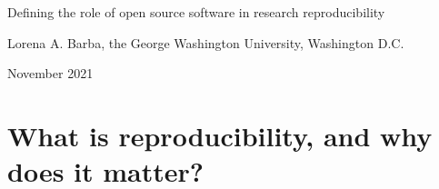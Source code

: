 \documentclass{statement}
\newlength{\up}
\begin{document}

\renewcommand{\thepage} {\arabic{page}}

\thispagestyle{empty}

{ \Huge Defining the role of open source software in research reproducibility} 
\medskip

Lorena A. Barba, the George Washington University, Washington D.C. 

November 2021



\vspace{1cm}

\begin{abstract}
Reproducibility is inseparable from transparency, as sharing data, code and computational environment is a pre-requisite for being able to retrace the steps of producing the research results. 
Others have made the case that this artifact sharing should adopt appropriate licensing schemes that permit reuse, modification and redistribution. 
I make a new proposal for the role of open source software, stemming from the lessons it teaches about distributed collaboration and a commitment-based culture. 
Reviewing the defining features of open source software (licensing, development, communities), I look for explanation of its success from the perspectives of connectivism---a learning theory for the digital age---and the language-action framework of Winograd and Flores. 
I contend that reproducibility engenders trust, which we routinely build in community via conversations, and the practices of open source software help us to learn how to be more effective learning (discovering) together, contributing to the same goal.
\end{abstract}

\section*{What is reproducibility, and why does it matter?}
\vspace{\up}
\end{document}
